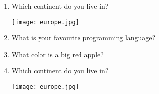 \documentclass[12pt,onside,a4paper,article]{memoir}
\newcommand\blankpage{%
    \null
    \thispagestyle{empty}%
    \addtocounter{page}{-1}%
    \newpage}
\begin{document}
\clearpage\blankpage
\begin{enumerate}
\setcounter{page}{1}

\item{Which continent do you live in?}
\begin{flushright}
\end{flushright}
\begin{flushleft}
\texttt{[image: europe.jpg]}
\end{flushleft}
\vspace{5cm}

\item{What is your favourite programming language?}
\begin{flushright}
\end{flushright}
\item{What color is a big red apple?}
\begin{flushright}
\end{flushright}
\item{Which continent do you live in?}
\begin{flushright}
\end{flushright}
\begin{flushleft}
\texttt{[image: europe.jpg]}
\end{flushleft}
\vspace{5cm}


\end{enumerate}
\end{document}
